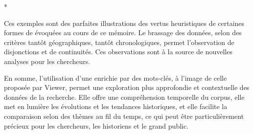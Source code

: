 \newpage
*\\\par
Ces exemples sont des parfaites illustrations des vertus heuristiques de certaines formes de  évoquées au cours de ce mémoire. Le brassage des données, selon des critères tantôt géographiques, tantôt chronologiques, permet l’observation de disjonctions et de continuités. Ces observations sont à la source de nouvelles analyses pour les chercheurs. \par
En somme, l'utilisation d'une  enrichie par des mots-clés, à l’image de celle proposée par  Viewer, permet une exploration plus approfondie et contextuelle des données de la recherche. Elle offre une compréhension temporelle du corpus, elle met en lumière les évolutions et les tendances historiques, et elle facilite la comparaison selon des thèmes au fil du temps, ce qui peut être particulièrement précieux pour les chercheurs, les historiens et le grand public.

